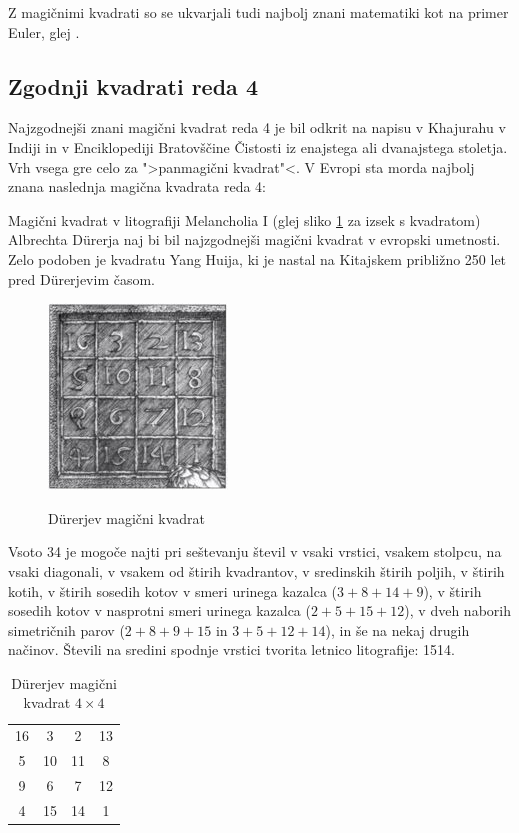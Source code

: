 \documentclass[a4paper,12pt]{article}
\theoremstyle{definition}
\theoremstyle{plain}
\newenvironment{magic}[3]{%
    \begin{table}[ht]
    \centering
    \caption{#2}
    \label{#3}
    \begin{tabular}{|*{#1}{c|}} %
    \hline
}{%
    \hline
    \end{tabular}
    \end{table}
}
\begin{document}
Z magičnimi kvadrati so se ukvarjali tudi najbolj znani matematiki kot na
primer Euler, glej \cite{euler}. %


\subsection{Zgodnji kvadrati reda 4}

Najzgodnejši znani magični kvadrat reda 4 je bil odkrit na napisu
v Khajurahu v Indiji in v Enciklopediji Bratovščine Čistosti iz enajstega
ali dvanajstega stoletja. Vrh vsega gre celo za ">panmagični kvadrat"<.
V Evropi sta morda najbolj znana naslednja magična kvadrata reda 4:

Magični kvadrat v litografiji Melancholia I (glej sliko \ref{fig:durer}
za izsek s kvadratom) Albrechta Dürerja naj bi bil najzgodnejši magični kvadrat
v evropski umetnosti. Zelo podoben je kvadratu Yang Huija, ki je nastal na Kitajskem
približno 250 let pred Dürerjevim časom. %

\begin{figure}[!ht]
   \centering
   \caption{Dürerjev magični kvadrat}
   \includegraphics[scale=1.5]{durer.png}
   \label{fig:durer} 
\end{figure}

Vsoto 34 je mogoče najti pri seštevanju števil v vsaki vrstici, vsakem stolpcu,
na vsaki diagonali, v vsakem od štirih kvadrantov, v sredinskih štirih poljih,
v štirih kotih, v štirih sosedih kotov v smeri urinega kazalca ($3+8+14+9$), v
štirih sosedih kotov v nasprotni smeri urinega kazalca ($2+5+15+12$), v dveh naborih
simetričnih parov ($2+8+9+15$ in $3+5+12+14$), in še na nekaj drugih načinov.
Števili na sredini spodnje vrstici tvorita letnico litografije: 1514.
%
\begin{magic}{4}{Dürerjev magični kvadrat $4\times 4$}{table:durer}
16 &  3 &  2 & 13 \\
 5 & 10 & 11 &  8 \\
 9 &  6 &  7 & 12 \\
 4 & 15 & 14 &  1 \\
\end{magic}
\end{document}
